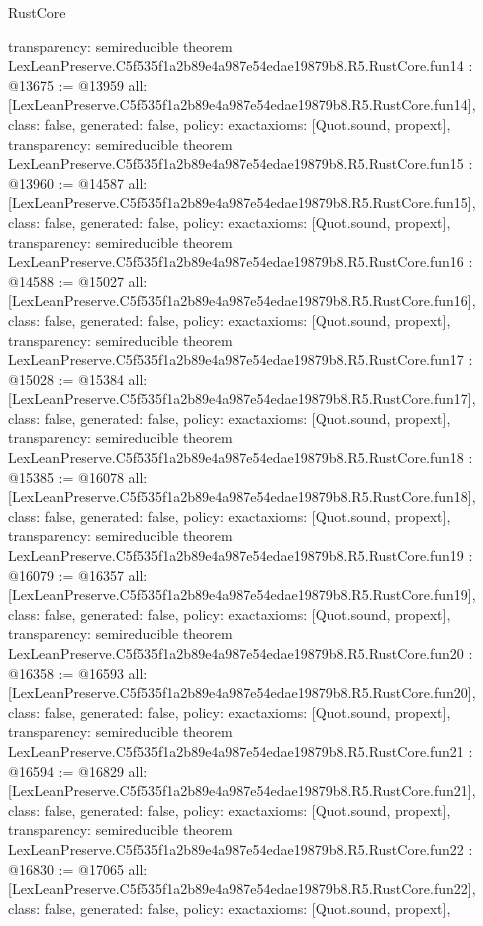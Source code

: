 \begin{lexlean}{RustCore}
\begin{coremodule}
{  transparency: semireducible
}
theorem LexLeanPreserve.C5f535f1a2b89e4a987e54edae19879b8.R5.RustCore.fun14 : @13675 := @13959 {
  all: [LexLeanPreserve.C5f535f1a2b89e4a987e54edae19879b8.R5.RustCore.fun14],
  class: false,
  generated: false,
  policy: exact{axioms: [Quot.sound, propext]},
  transparency: semireducible
}
theorem LexLeanPreserve.C5f535f1a2b89e4a987e54edae19879b8.R5.RustCore.fun15 : @13960 := @14587 {
  all: [LexLeanPreserve.C5f535f1a2b89e4a987e54edae19879b8.R5.RustCore.fun15],
  class: false,
  generated: false,
  policy: exact{axioms: [Quot.sound, propext]},
  transparency: semireducible
}
theorem LexLeanPreserve.C5f535f1a2b89e4a987e54edae19879b8.R5.RustCore.fun16 : @14588 := @15027 {
  all: [LexLeanPreserve.C5f535f1a2b89e4a987e54edae19879b8.R5.RustCore.fun16],
  class: false,
  generated: false,
  policy: exact{axioms: [Quot.sound, propext]},
  transparency: semireducible
}
theorem LexLeanPreserve.C5f535f1a2b89e4a987e54edae19879b8.R5.RustCore.fun17 : @15028 := @15384 {
  all: [LexLeanPreserve.C5f535f1a2b89e4a987e54edae19879b8.R5.RustCore.fun17],
  class: false,
  generated: false,
  policy: exact{axioms: [Quot.sound, propext]},
  transparency: semireducible
}
theorem LexLeanPreserve.C5f535f1a2b89e4a987e54edae19879b8.R5.RustCore.fun18 : @15385 := @16078 {
  all: [LexLeanPreserve.C5f535f1a2b89e4a987e54edae19879b8.R5.RustCore.fun18],
  class: false,
  generated: false,
  policy: exact{axioms: [Quot.sound, propext]},
  transparency: semireducible
}
theorem LexLeanPreserve.C5f535f1a2b89e4a987e54edae19879b8.R5.RustCore.fun19 : @16079 := @16357 {
  all: [LexLeanPreserve.C5f535f1a2b89e4a987e54edae19879b8.R5.RustCore.fun19],
  class: false,
  generated: false,
  policy: exact{axioms: [Quot.sound, propext]},
  transparency: semireducible
}
theorem LexLeanPreserve.C5f535f1a2b89e4a987e54edae19879b8.R5.RustCore.fun20 : @16358 := @16593 {
  all: [LexLeanPreserve.C5f535f1a2b89e4a987e54edae19879b8.R5.RustCore.fun20],
  class: false,
  generated: false,
  policy: exact{axioms: [Quot.sound, propext]},
  transparency: semireducible
}
theorem LexLeanPreserve.C5f535f1a2b89e4a987e54edae19879b8.R5.RustCore.fun21 : @16594 := @16829 {
  all: [LexLeanPreserve.C5f535f1a2b89e4a987e54edae19879b8.R5.RustCore.fun21],
  class: false,
  generated: false,
  policy: exact{axioms: [Quot.sound, propext]},
  transparency: semireducible
}
theorem LexLeanPreserve.C5f535f1a2b89e4a987e54edae19879b8.R5.RustCore.fun22 : @16830 := @17065 {
  all: [LexLeanPreserve.C5f535f1a2b89e4a987e54edae19879b8.R5.RustCore.fun22],
  class: false,
  generated: false,
  policy: exact{axioms: [Quot.sound, propext]},
}
\end{coremodule}
\end{lexlean}
